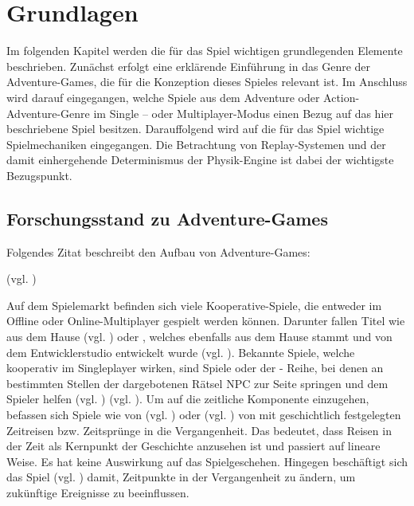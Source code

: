 \chapter{Grundlagen}\label{sec:basics}
Im folgenden Kapitel werden die für das Spiel wichtigen grundlegenden Elemente beschrieben. Zunächst erfolgt eine erklärende Einführung in das Genre der Adventure-Games, die für die Konzeption dieses Spieles relevant ist. Im Anschluss wird darauf eingegangen, welche Spiele aus dem Adventure oder Action-Adventure-Genre im Single – oder Multiplayer-Modus einen Bezug auf das hier beschriebene Spiel besitzen. Darauffolgend wird auf die für das Spiel wichtige Spielmechaniken eingegangen. Die Betrachtung von Replay-Systemen und der damit einhergehende Determinismus der Physik-Engine ist dabei der wichtigste Bezugspunkt.
\section{Forschungsstand zu Adventure-Games}
Folgendes Zitat beschreibt den Aufbau von Adventure-Games:

 (vgl. \cite{noauthor_what_2012})

Auf dem Spielemarkt befinden sich viele Kooperative-Spiele, die entweder im Offline oder Online-Multiplayer gespielt werden können. Darunter fallen Titel wie  aus dem Hause  (vgl. \cite{arts_way_2017}) oder , welches ebenfalls aus dem Hause  stammt und von dem Entwicklerstudio  entwickelt wurde (vgl. \cite{arts_entdecke_2022}). Bekannte Spiele, welche kooperativ im Singleplayer wirken, sind Spiele  oder der - Reihe, bei denen an bestimmten Stellen der dargebotenen Rätsel NPC zur Seite springen und dem Spieler helfen (vgl. \cite{noauthor_last_tlou}) (vgl. \cite{noauthor_uncharted_nodate}). Um auf die zeitliche Komponente einzugehen, befassen sich Spiele wie  von  (vgl. \cite{noauthor_kaufen_nodate}) oder  (vgl. \cite{noauthor_bioshock_nodate}) von  mit geschichtlich festgelegten Zeitreisen bzw. Zeitsprünge in die Vergangenheit. Das bedeutet, dass Reisen in der Zeit als Kernpunkt der Geschichte anzusehen ist und passiert auf lineare Weise. Es hat keine Auswirkung auf das Spielgeschehen. Hingegen beschäftigt sich das Spiel  (vgl. \cite{noauthor_life_nodate}) damit, Zeitpunkte in der Vergangenheit zu ändern, um zukünftige Ereignisse zu beeinflussen.

